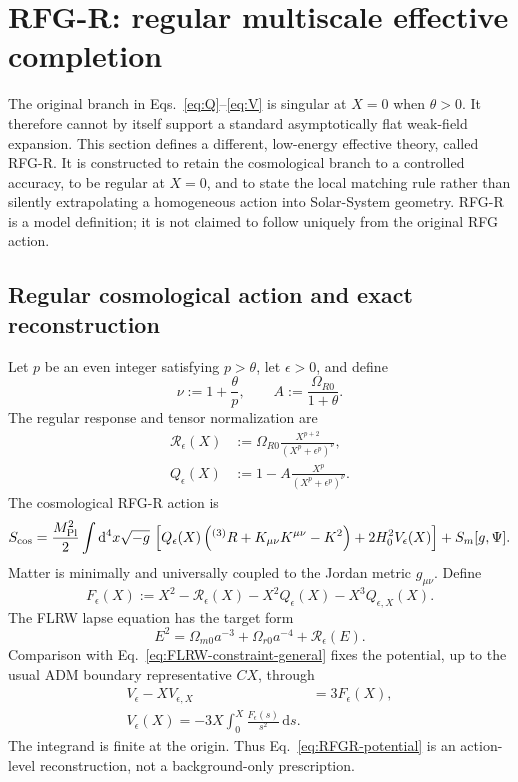 \documentclass[11pt,a4paper]{article}
\renewcommand{\dd}{\mathrm{d}}
\newcommand{\mpl}{M_{\rm Pl}}
\begin{document}
\section{RFG-R: regular multiscale effective completion}
\label{sec:rfg-r}

The original branch in Eqs.~\eqref{eq:Q}--\eqref{eq:V} is singular at
\(X=0\) when \(\theta>0\). It therefore cannot by itself support a standard
asymptotically flat weak-field expansion. This section defines a different,
low-energy effective theory, called RFG-R. It is constructed to retain the
cosmological branch to a controlled accuracy, to be regular at \(X=0\), and
to state the local matching rule rather than silently extrapolating a
homogeneous action into Solar-System geometry. RFG-R is a model definition;
it is not claimed to follow uniquely from the original RFG action.

\subsection{Regular cosmological action and exact reconstruction}

Let \(p\) be an even integer satisfying \(p>\theta\), let
\(\epsilon>0\), and define
\begin{equation}
 \nu:=1+\frac{\theta}{p},\qquad
 A:=\frac{\Omega_{R0}}{1+\theta}.
\end{equation}
The regular response and tensor normalization are
\begin{align}
 \mathcal R_\epsilon(X)&:=
 \Omega_{R0}\frac{X^{p+2}}{\left(X^p+\epsilon^p\right)^\nu},
 \label{eq:RFGR-response}\\
 Q_\epsilon(X)&:=1-A\frac{X^p}{\left(X^p+\epsilon^p\right)^\nu}.
 \label{eq:RFGR-Q}
\end{align}
The cosmological RFG-R action is
\begin{equation}
 S_{\rm cos}=\frac{\mpl^2}{2}\int\dd^4x\sqrt{-g}\,
 \left[Q_\epsilon(X)\left({}^{(3)}R+K_{\mu\nu}K^{\mu\nu}-K^2\right)
 +2H_0^2V_\epsilon(X)\right]+S_m[g,\Psi].
 \label{eq:RFGR-cosmological-action}
\end{equation}
Matter is minimally and universally coupled to the Jordan metric \(g_{\mu\nu}\).
Define
\begin{equation}
 F_\epsilon(X):=X^2-\mathcal R_\epsilon(X)-X^2Q_\epsilon(X)
 -X^3Q_{\epsilon,X}(X).
 \label{eq:RFGR-F}
\end{equation}
The FLRW lapse equation has the target form
\begin{equation}
 \boxed{E^2=\Omega_{m0}a^{-3}+\Omega_{r0}a^{-4}+\mathcal R_\epsilon(E).}
 \label{eq:RFGR-background}
\end{equation}
Comparison with Eq.~\eqref{eq:FLRW-constraint-general} fixes the potential,
up to the usual ADM boundary representative \(CX\), through
\begin{align}
 V_\epsilon-XV_{\epsilon,X}&=3F_\epsilon(X),\\
 \boxed{V_\epsilon(X)=-3X\int_0^X\frac{F_\epsilon(s)}{s^2}\,\dd s.}
 \label{eq:RFGR-potential}
\end{align}
The integrand is finite at the origin. Thus Eq.~\eqref{eq:RFGR-potential} is
an action-level reconstruction, not a background-only prescription.
\end{document}
